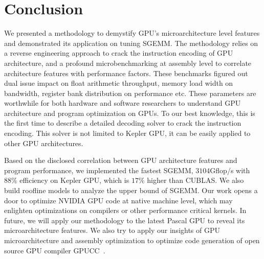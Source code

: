 \section{Conclusion}
\label{sec:conclusion}
We presented a methodology to demystify GPU's microarchitecture level features and demonstrated its 
application on tuning SGEMM. The methodology relies on a reverse engineering approach to crack the instruction encoding 
of GPU architecture, and a profound microbenchmarking at assembly level to correlate architecture features with 
performance factors. These benchmarks figured out dual issue impact on float arithmetic throughput, memory load width on bandwidth, register 
bank distribution on performance etc. These parameters are worthwhile for both hardware and software researchers to 
understand GPU architecture and program optimization on GPUs. 
To our best knowledge, this is the 
first time to describe a detailed decoding solver to crack the instruction encoding. 
This solver is not limited to Kepler GPU, it can be easily applied to other GPU architectures. 

Based on the disclosed correlation between GPU architecture features and program performance, we implemented the
fastest SGEMM,  $3104$Gflop/s with $88\%$ efficiency on Kepler GPU, which is $17\%$ higher than CUBLAS. 
We also build roofline models to analyze the upper bound of SGEMM.
Our work opens a door to optimize NVIDIA GPU code at native machine level, which may enlighten optimizations on
compilers or other performance critical kernels.
In future, we will apply our methodology to the latest Pascal GPU to reveal its microarchitecture features.
We also try to apply our insights of GPU microarchitecture and assembly optimization to optimize code generation of open source GPU compiler
GPUCC~\cite{wu2016gpucc}.
